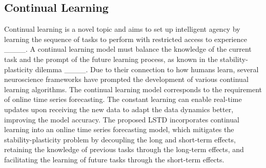 \subsection{Continual Learning}
Continual learning is a novel topic and aims to set up intelligent agency by learning the sequence of tasks to perform with restricted access to experience ____. A continual learning model must balance the knowledge of the current task and the prompt of the future learning process, as known in the stability-plasticity dilemma ____. Due to their connection to how humans learn, several neuroscience frameworks have prompted the development of various continual learning algorithms. The continual learning model corresponds to the requirement of online time series forecasting. The constant learning can enable real-time updates upon receiving the new data to adapt the data dynamics better, improving the model accuracy.
The proposed LSTD incorporates continual learning into an online time series forecasting model, which mitigates the stability-plasticity problem by decoupling the long and short-term effects, retaining the knowledge of previous tasks through the long-term effects, and facilitating the learning of future tasks through the short-term effects.
